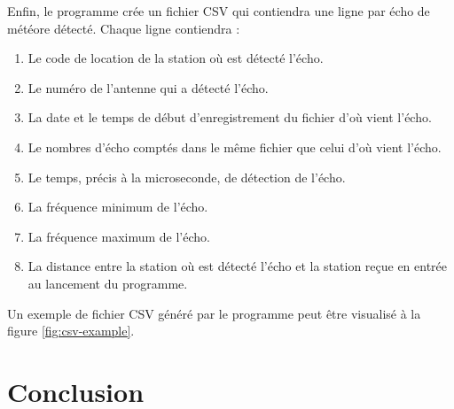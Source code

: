 \documentclass[11pt]{article}
\begin{document}
Enfin, le programme crée un fichier CSV qui contiendra une ligne par écho de météore détecté.
Chaque ligne contiendra :
\begin{enumerate}
    \item Le code de location de la station où est détecté l'écho.
    \item Le numéro de l'antenne qui a détecté l'écho.
    \item La date et le temps de début d'enregistrement du fichier d'où vient l'écho.
    \item Le nombres d'écho comptés dans le même fichier que celui d'où vient l'écho.
    \item Le temps, précis à la microseconde, de détection de l'écho.
    \item La fréquence minimum de l'écho.
    \item La fréquence maximum de l'écho.
    \item La distance entre la station où est détecté l'écho et la station reçue en entrée au lancement du programme.
\end{enumerate}

Un exemple de fichier CSV généré par le programme peut être visualisé à la figure \ref{fig:csv-example}.

\newpage

\section{Conclusion}
\end{document}
